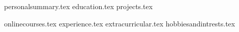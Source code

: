 \documentclass[12pt, a4paper]{awesome-cv}
\newcommand*{\sectiondir}{resume/}
\begin{document}
\makecvheader

{personalsummary.tex}
{education.tex}
{projects.tex}
\pagebreak

{onlinecourses.tex}
{experience.tex}
{extracurricular.tex}
{hobbiesandintrests.tex}
\end{document}
